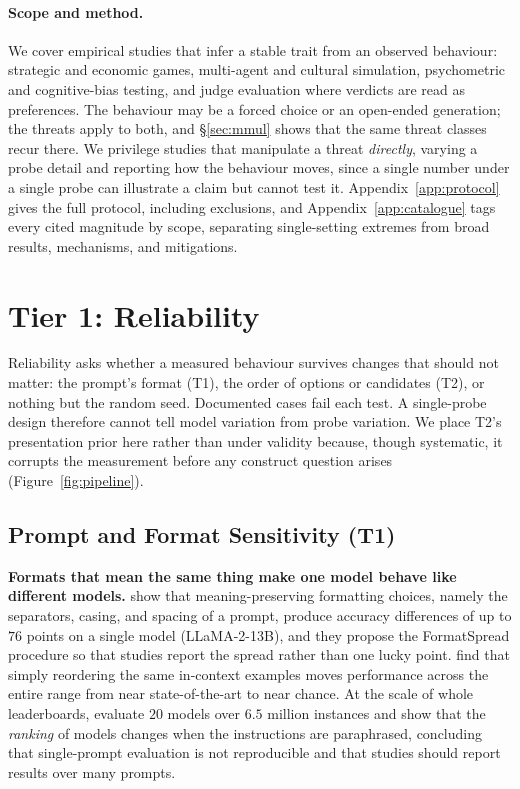 \documentclass[11pt]{article}
\begin{document}
\paragraph{Scope and method.} We cover empirical studies that infer a
stable trait from an observed behaviour: strategic and economic games,
multi-agent and cultural simulation, psychometric and cognitive-bias testing,
and judge evaluation where verdicts are read as preferences. The behaviour may
be a forced choice or an open-ended generation; the threats apply to both, and
\S\ref{sec:mmul} shows that the same threat classes recur there. We
privilege studies that manipulate a threat \emph{directly}, varying a probe
detail and reporting how the behaviour moves, since a single number under a
single probe can illustrate a claim but cannot test it.
Appendix~\ref{app:protocol} gives the full protocol, including exclusions, and
Appendix~\ref{app:catalogue} tags every cited magnitude by scope, separating
single-setting extremes from broad results, mechanisms, and mitigations.


\section{Tier 1: Reliability}
\label{sec:reliability}

Reliability asks whether a measured behaviour survives changes that should not
matter: the prompt's format (T1), the order of options or candidates (T2), or
nothing but the random seed. Documented cases fail each test. A single-probe
design therefore cannot tell model variation from probe variation. We
place T2's presentation prior here rather than under validity because, though
systematic, it corrupts the measurement before any construct question arises
(Figure~\ref{fig:pipeline}).

\subsection{Prompt and Format Sensitivity (T1)}
\label{sec:t1}

\textbf{Formats that mean the same thing make one model behave like different
models.}
\citet{sclar2024quantifying} show that meaning-preserving formatting choices,
namely the separators, casing, and spacing of a prompt, produce accuracy
differences of up to $76$ points on a single model (LLaMA-2-13B), and they
propose the FormatSpread procedure so that studies report the spread rather
than one lucky point. \citet{lu2022fantastically} find that simply reordering
the same in-context examples moves performance across the entire range from
near state-of-the-art to near chance. At the scale of whole leaderboards,
\citet{mizrahi2024state} evaluate $20$ models over $6.5$ million instances
and show that the \emph{ranking} of models changes when the instructions are
paraphrased, concluding that single-prompt evaluation is not reproducible and
that studies should report results over many prompts.
\end{document}

